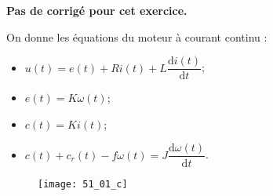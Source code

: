 \normaltrue \difficilefalse \tdifficilefalse
\correctiontrue


\setcounter{numques}{0}
\ifcorrection
\else
\textbf{Pas de corrigé pour cet exercice.}
\fi


\ifprof 
\else
On donne les équations du moteur à courant continu :
\begin{itemize}
\item $u(t) = e(t)+ Ri(t) +L \dfrac{\text{d}i(t)}{\text{d} t}$;
\item $e(t)=K\omega(t)$;
\item $c(t)=Ki(t)$;
\item $c(t)+c_r(t)- f\omega(t)=J\dfrac{\text{d}\omega(t)}{\text{d} t}$.
\end{itemize}
\fi

\ifprof
\begin{figure}[H]
\centering
\texttt{[image: 51\_01\_c]}
\end{figure}
\else
\fi



